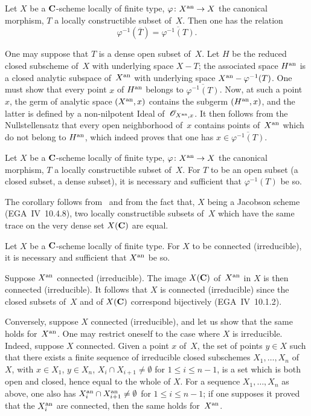 \begin{proposition}
\label{XII.2.2}
Let $X$ be a $\mathbf{C}$-scheme locally of finite type,
$\varphi\colon X^{\an}\to X$ the canonical morphism, $T$ a
locally constructible subset of~$X$. Then one has the relation
$$
\varphi^{-1}(\overline{T})=\overline{\varphi^{-1}(T)}.
$$
\end{proposition}

One may suppose that $T$ is a dense open subset of~$X$. Let $H$ be the
reduced closed subscheme of~$X$ with underlying space
$X-T$; the associated space $H^{\mathrm{an}}$ is a closed analytic
subspace of~$X^{\mathrm{an}}$ with underlying space
$X^{\mathrm{an}}-\varphi^{-1}(T)$. One must show that every point $x$ of
$H^{\mathrm{an}}$ belongs to $\overline{\varphi^{-1}(T)}$. Now, at such a
point $x$, the germ of analytic space $(X^{\mathrm{an}},x)$ contains the
subgerm $(H^{\mathrm{an}},x)$, and the latter is defined by a
non-nilpotent Ideal of~$\cal{O}_{X^{\an},x}$. It then follows from the
Nullstellensatz \cite[~\S 4~cor]{XII.4} that every open neighborhood of~$x$
contains points of~$X^{\mathrm{an}}$ which do not belong to
$H^{\mathrm{an}}$, which indeed proves that one has
$x\in\overline{\varphi^{-1}(T)}$.

\begin{corollary}
\label{XII.2.3}
Let
$X$ be a $\mathbf{C}$-scheme locally of finite type, $\varphi
\colon X^\an \to X$ the canonical morphism, $T$ a locally
constructible subset of~$X$. For $T$ to be an open subset (\resp a
closed subset, \resp a dense subset), it is necessary and sufficient that
$\varphi^{-1} (T)$ be so.
\end{corollary}

The corollary follows from~ and from the fact that, $X$
being a Jacobson scheme (EGA~IV~10.4.8), two
locally constructible subsets of~$X$ which have the same trace on the
very dense set $X (\mathbf{C} )$ are equal.

\begin{proposition}
\label{XII.2.4} Let $X$ be a $\mathbf{C}$-scheme locally of
finite type. For $X$ to be connected (\resp irreducible), it is necessary
and sufficient that $X^{\mathrm{an}}$ be so.
\end{proposition}

Suppose $X^{\mathrm{an}} $ connected (\resp irreducible). The image $X (\mathbf{C})
$ of~$X^{\mathrm{an}}$ in $X$ is then connected (\resp irreducible). It
follows that $X$ is connected (\resp irreducible) since the
closed subsets of~$X$ and of $X (\mathbf{C})$ correspond bijectively
(EGA~IV~10.1.2).

Conversely, suppose $X$ connected (\resp irreducible), and
let us show that the same holds for~$X^{\mathrm{an}}$. One may restrict oneself to the case
where $X$ is irreducible. Indeed, suppose $X$ connected.
Given a point $x$ of~$X$, the set of points $y \in X$
such that there exists a finite sequence of irreducible closed
subschemes $X_1, \dots, X_n$ of~$X$, with $x \in X_1$, $y \in
X_n$, $X_i \cap X_{i+1} \neq \emptyset $ for $1 \leq i \leq n-1$,
is a set which is both open and closed, hence equal to
the whole of $X$. For a sequence $X_1, \dots, X_n$ as
above, one also has $X_{i}^{\mathrm{an}} \cap X_{i+1}^{\mathrm{an}} \neq
\emptyset $ for $1 \leq i \leq n-1 $; if one supposes it
proved that the $X_{i}^{\mathrm{an}}$ are connected, then the same
holds for~$X^{\mathrm{an}}$.

